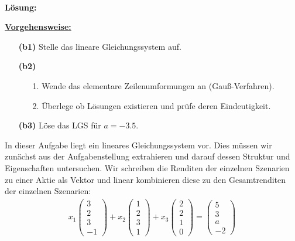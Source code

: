 \ \\
\textbf{Lösung:}
\begin{mdframed}
\underline{\textbf{Vorgehensweise:}}
\renewcommand{\labelenumi}{\theenumi.}
\begin{enumerate}
\item[\textbf{(b1)}] Stelle das lineare Gleichungssystem auf.
\item[\textbf{(b2)}] 
\begin{enumerate}
	\item[1.] Wende das elementare Zeilenumformungen an (Gauß-Verfahren).
	\item[2.] Überlege ob Lösungen existieren und prüfe deren Eindeutigkeit.
\end{enumerate}

\item[\textbf{(b3)}] Löse das LGS für $a=-3.5 $.
\end{enumerate}
\end{mdframed}

In dieser Aufgabe liegt ein lineares Gleichungssystem vor.
Dies müssen wir zunächst aus der Aufgabenstellung extrahieren und darauf dessen Struktur und Eigenschaften untersuchen.
Wir schreiben die Renditen der einzelnen Szenarien zu einer Aktie als Vektor und linear kombinieren diese zu den Gesamtrenditen der einzelnen Szenarien:
\begin{align*}
	x_1
	\begin{pmatrix}
		3 \\ 2 \\ 3 \\ -1
	\end{pmatrix}
	+
	x_2
	\begin{pmatrix}
		1 \\ 2 \\ 3 \\ 1
	\end{pmatrix}
	+
	x_3
	\begin{pmatrix}
		2 \\ 2 \\ 1 \\ 0
	\end{pmatrix}
	=
	\begin{pmatrix}
		5 \\ 3 \\ a \\ -2
	\end{pmatrix}
\end{align*}


